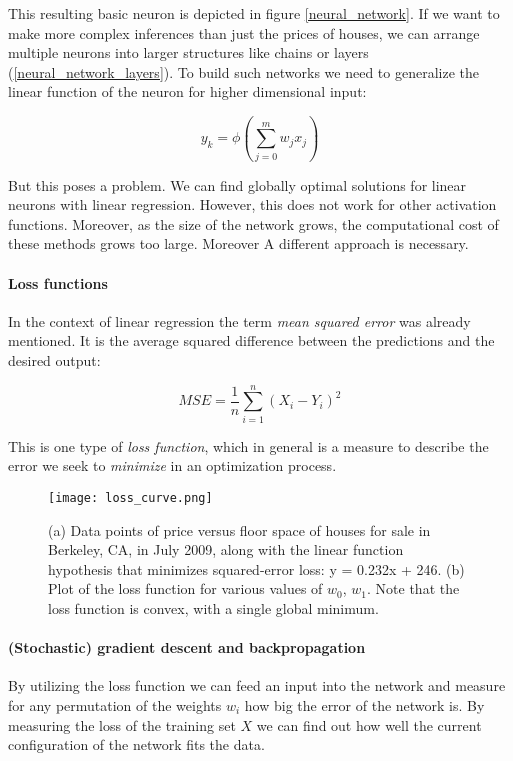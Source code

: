 This resulting basic neuron is depicted in figure \ref{neural_network}. If we want to make more complex inferences than just the prices of houses, we can arrange multiple neurons into larger structures like chains or layers (\ref{neural_network_layers}). To build such networks we need to generalize the linear function of the neuron for higher dimensional input:

\begin{equation}
    y_k = \phi\left(\sum_{j=0}^{m}w_jx_j\right)
\end{equation}

But this poses a problem. We can find globally optimal solutions for linear neurons with linear regression. However, this does not work for other activation functions. Moreover, as the size of the network grows, the computational cost of these methods grows too large. Moreover A different approach is necessary.

\paragraph{Loss functions} In the context of linear regression the term \textit{mean squared error} was already mentioned. It is the average squared difference between the predictions and the desired output:

\begin{equation}
    MSE = \frac{1}{n} \sum_{i = 1}^{n}(X_i - Y_i)^2
\end{equation}

This is one type of \textit{loss function}, which in general is a measure to describe the error we seek to \textit{minimize} in an optimization process.

\begin{figure}
    \centering
    \texttt{[image: loss\_curve.png]}
    \caption{(a) Data points of price versus floor space of houses for sale in Berkeley, CA, in July 2009, along with the linear function hypothesis that minimizes squared-error loss: y = 0.232x + 246. (b) Plot of the loss function for various values of $ w_0 $, $ w_1 $. Note that the loss function is convex, with a single global minimum. \cite[p. 1251]{russell_artificial_2021}}
    \label{loss_curve}
\end{figure}

\paragraph{(Stochastic) gradient descent and backpropagation} By utilizing the loss function we can feed an input into the network and measure for any permutation of the weights $ w_i $ how big the error of the network is. By measuring the loss of the training set $ X $ we can find out how well the current configuration of the network fits the data.

